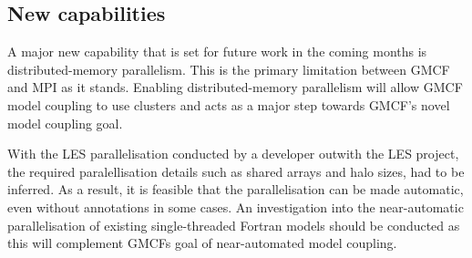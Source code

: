 \subsection{New capabilities}

A major new capability that is set for future work in the coming months is
distributed-memory parallelism. This is the primary limitation between GMCF and
MPI as it stands. Enabling distributed-memory parallelism will allow GMCF model
coupling to use clusters and acts as a major step towards GMCF's novel model
coupling goal.

With the LES parallelisation conducted by a developer outwith the LES project,
the required paralellisation details such as shared arrays and halo sizes, had
to be inferred. As a result, it is feasible that the parallelisation can be made
automatic, even without annotations in some cases. An investigation into the
near-automatic parallelisation of existing single-threaded Fortran models should
be conducted as this will complement GMCFs goal of near-automated model
coupling.
